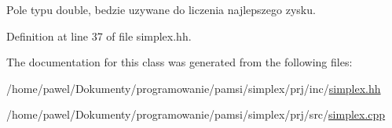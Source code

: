 Pole typu double, bedzie uzywane do liczenia najlepszego zysku. 



Definition at line 37 of file simplex.\-hh.



The documentation for this class was generated from the following files\-:\begin{DoxyCompactItemize}
\item 
/home/pawel/\-Dokumenty/programowanie/pamsi/simplex/prj/inc/\hyperlink{simplex_8hh}{simplex.\-hh}\item 
/home/pawel/\-Dokumenty/programowanie/pamsi/simplex/prj/src/\hyperlink{simplex_8cpp}{simplex.\-cpp}\end{DoxyCompactItemize}
